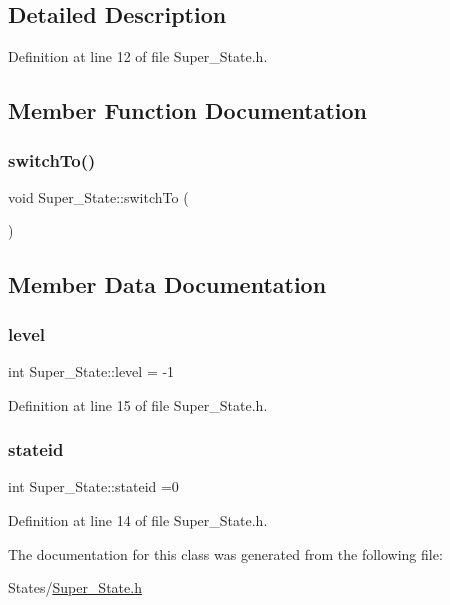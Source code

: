 \subsection{Detailed Description}


Definition at line 12 of file Super\+\_\+\+State.\+h.



\subsection{Member Function Documentation}
\hypertarget{class_super___state_a2f0cf545a5099f59e1c0bf87423ee846}{}\label{class_super___state_a2f0cf545a5099f59e1c0bf87423ee846} 
\subsubsection{\texorpdfstring{switch\+To()}{switchTo()}}
{\footnotesize\ttfamily void Super\+\_\+\+State\+::switch\+To (\begin{DoxyParamCaption}{ }\end{DoxyParamCaption})}



\subsection{Member Data Documentation}
\hypertarget{class_super___state_ad6b74d4864a4e2cccf58316cd1af2e83}{}\label{class_super___state_ad6b74d4864a4e2cccf58316cd1af2e83} 
\subsubsection{\texorpdfstring{level}{level}}
{\footnotesize\ttfamily int Super\+\_\+\+State\+::level = -\/1}



Definition at line 15 of file Super\+\_\+\+State.\+h.

\hypertarget{class_super___state_a5f3b37d247498fd969869834ab7904fa}{}\label{class_super___state_a5f3b37d247498fd969869834ab7904fa} 
\subsubsection{\texorpdfstring{stateid}{stateid}}
{\footnotesize\ttfamily int Super\+\_\+\+State\+::stateid =0}



Definition at line 14 of file Super\+\_\+\+State.\+h.



The documentation for this class was generated from the following file\+:\begin{DoxyCompactItemize}
\item 
States/\hyperlink{_super___state_8h}{Super\+\_\+\+State.\+h}\end{DoxyCompactItemize}
